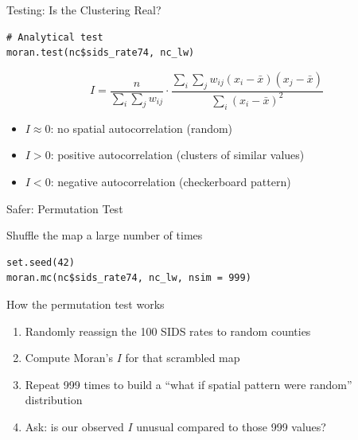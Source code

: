 \documentclass[aspectratio=169, 12pt]{beamer}
\begin{document}

\begin{frame}[fragile]{Testing: Is the Clustering Real?}
\begin{lstlisting}
# Analytical test
moran.test(nc$sids_rate74, nc_lw)
\end{lstlisting}

$$I = \frac{n}{\sum_{i}\sum_{j} w_{ij}} \cdot \frac{\sum_{i}\sum_{j} w_{ij}(x_i - \bar{x})(x_j - \bar{x})}{\sum_i (x_i - \bar{x})^2}$$
\vspace{.5em}
\begin{itemize}
\item $I \approx 0$: no spatial autocorrelation (random)
\item $I > 0$: positive autocorrelation (clusters of similar values)
\item $I < 0$: negative autocorrelation (checkerboard pattern)
\end{itemize}
\end{frame}


\begin{frame}[fragile]{Safer: Permutation Test}

Shuffle the map a large number of times

\begin{lstlisting}
set.seed(42)
moran.mc(nc$sids_rate74, nc_lw, nsim = 999)
\end{lstlisting}

  \vspace{0.4em}
  \begin{block}{How the permutation test works}
    \begin{enumerate}
      \item Randomly reassign the 100 SIDS rates to random counties
      \item Compute Moran's $I$ for that scrambled map
      \item Repeat 999 times to build a ``what if spatial pattern were random'' distribution
      \item Ask: is our observed $I$ unusual compared to those 999 values?
    \end{enumerate}
  \end{block}
\end{frame}

\end{document}
